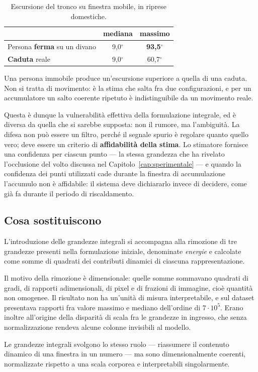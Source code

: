 \begin{table}[ht]
\centering
\caption{Escursione del tronco su finestra mobile, in riprese domestiche.}
\label{tab:ambiguita}
\begin{tabular}{lcc}
\hline
 & \textbf{mediana} & \textbf{massimo} \\
\hline
Persona \textbf{ferma} su un divano & 9,0$^\circ$ & \textbf{93,5}$^\circ$ \\
\textbf{Caduta} reale & 9,0$^\circ$ & 60,7$^\circ$ \\
\hline
\end{tabular}
\end{table}

Una persona immobile produce un'escursione superiore a quella di una caduta.
Non si tratta di movimento: è la stima che salta fra due configurazioni, e per
un accumulatore un salto coerente ripetuto è indistinguibile da un movimento
reale.

Questa è dunque la vulnerabilità effettiva della formulazione integrale, ed è
diversa da quella che si sarebbe supposta: non il rumore, ma l'ambiguità. La
difesa non può essere un filtro, perché il segnale spurio è regolare quanto
quello vero; deve essere un criterio di \textbf{affidabilità della stima}. Lo
stimatore fornisce una confidenza per ciascun punto --- la stessa grandezza che
ha rivelato l'occlusione del volto discussa nel
Capitolo~\ref{cap:sperimentale} --- e quando la confidenza dei punti utilizzati
cade durante la finestra di accumulazione l'accumulo non è affidabile: il
sistema deve dichiararlo invece di decidere, come già fa durante il periodo di
riscaldamento.

\subsection{Cosa sostituiscono}

L'introduzione delle grandezze integrali si accompagna alla rimozione di tre
grandezze presenti nella formulazione iniziale, denominate \emph{energie} e
calcolate come somme di quadrati dei contributi dinamici di ciascuna
rappresentazione.

Il motivo della rimozione è dimensionale: quelle somme sommavano quadrati di
gradi, di rapporti adimensionali, di pixel e di frazioni di immagine, cioè
quantità non omogenee. Il risultato non ha un'unità di misura interpretabile, e
sul dataset presentava rapporti fra valore massimo e mediano dell'ordine di
$7\cdot10^{5}$. Erano inoltre all'origine della disparità di scala fra le
grandezze in ingresso, che senza normalizzazione rendeva alcune colonne
invisibili al modello.

Le grandezze integrali svolgono lo stesso ruolo — riassumere il contenuto
dinamico di una finestra in un numero — ma sono dimensionalmente coerenti,
normalizzate rispetto a una scala corporea e interpretabili singolarmente.
